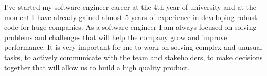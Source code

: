 I've started my software engineer career at the 4th year of university and at the moment I have already gained almost 5 years of experience in developing robust code for huge companies.
As a software engineer I am always focused on solving problems and challenges that will help the company grow and improve performance.
It is very important for me to work on solving complex and unusual tasks, to actively communicate with the team and stakeholders, to make decisions together that will allow us to build a high quality product.